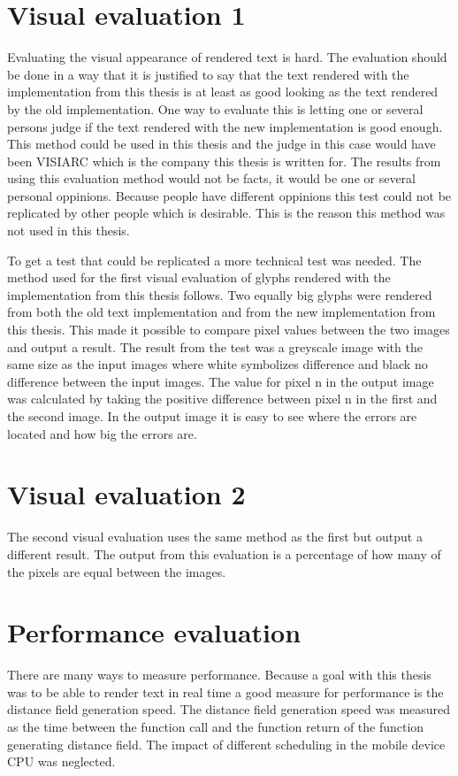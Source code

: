 \section{Visual evaluation 1}\label{viseval1}
Evaluating the visual appearance of rendered text is hard. The evaluation should be done in a way that it is justified to say that the text rendered with the implementation from this thesis is at least as good looking as the text rendered by the old implementation. One way to evaluate this is letting one or several persons judge if the text rendered with the new implementation is good enough. This method could be used in this thesis and the judge in this case would have been VISIARC which is the company this thesis is written for. The results from using this evaluation method would not be facts, it would be one or several personal oppinions. Because people have different oppinions this test could not be replicated by other people which is desirable. This is the reason this method was not used in this thesis.

To get a test that could be replicated a more technical test was needed. The method used for the first visual evaluation of glyphs rendered with the implementation from this thesis follows. Two equally big glyphs were rendered from both the old text implementation and from the new implementation from this thesis. This made it possible to compare pixel values between the two images and output a result. The result from the test was a greyscale image with the same size as the input images where white symbolizes difference and black no difference between the input images. The value for pixel n in the output image was calculated by taking the positive difference between pixel n in the first and the second image. In the output image it is easy to see where the errors are located and how big the errors are.
\section{Visual evaluation 2}\label{viseval2} 
The second visual evaluation uses the same method as the first but output a different result. The output from this evaluation is a percentage of how many of the pixels are equal between the images. 
\section{Performance evaluation}\label{pereval}
There are many ways to measure performance. Because a goal with this thesis was to be able to render text in real time a good measure for performance is the distance field generation speed. The distance field generation speed was measured as the time between the function call and the function return of the function generating distance field. The impact of different scheduling in the mobile device CPU was neglected.

